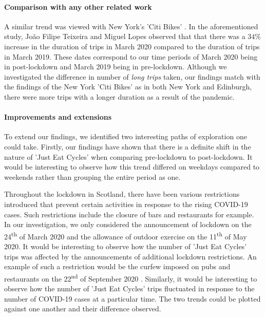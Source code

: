 \documentclass[11pt,a4paper]{article}
\begin{document}
\paragraph{Comparison with any other related work} A similar trend was viewed with New York's 'Citi Bikes' \cite{citiBike}. In the aforementioned study, João Filipe Teixeira and Miguel Lopes observed that that there was a $34\%$ increase in the duration of trips in March 2020 compared to the duration of trips in March 2019. These dates correspond to our time periods of March 2020 being in post-lockdown and March 2019 being in pre-lockdown. Although we investigated the difference in number of \emph{long trips} taken, our findings match with the findings of the New York 'Citi Bikes' as in both New York and Edinburgh, there were more trips with a longer duration as a result of the pandemic.

\paragraph{Improvements and extensions} To extend our findings, we identified two interesting paths of exploration one could take. Firstly, our findings have shown that there is a definite shift in the nature of 'Just Eat Cycles' when comparing pre-lockdown to post-lockdown. It would be interesting to observe how this trend differed on weekdays compared to weekends rather than grouping the entire period as one.\par Throughout the lockdown in Scotland, there have been various restrictions introduced that prevent certain activities in response to the rising COVID-19 cases. Such restrictions include the closure of bars and restaurants for example. In our investigation, we only considered the announcement of lockdown on the 24\textsuperscript{th} of March 2020 and the allowance of outdoor exercise on the 11\textsuperscript{th} of May 2020. It would be interesting to observe how the number of 'Just Eat Cycles' trips was affected by the announcements of additional lockdown restrictions. An example of such a restriction would be the curfew imposed on pubs and restaurants on the 22\textsuperscript{nd} of September 2020 \cite{timeline}. Similarly, it would be interesting to observe how the number of 'Just Eat Cycles' trips fluctuated in response to the number of COVID-19 cases at a particular time. The two trends could be plotted against one another and their difference observed. 



\end{document}
